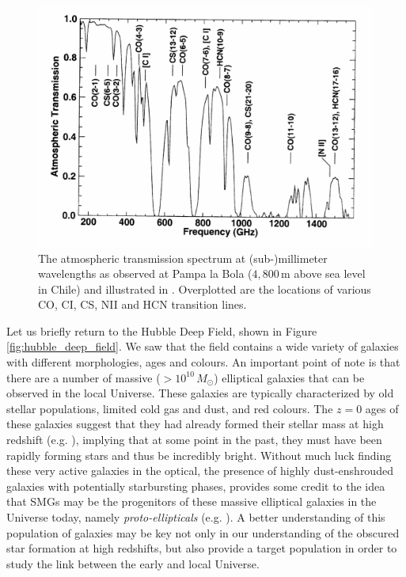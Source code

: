 \begin{figure}
    \centering
	\includegraphics[angle=0.8, origin=c, width=0.8\columnwidth]{Figures/transmission.pdf}
	\caption[Atmospheric transmission of (sub-) mm wavelengths from Pampa la Bola]{The atmospheric transmission spectrum at (sub-)millimeter wavelengths as observed at Pampa la Bola ($4,800\,$m above sea level in Chile) and illustrated in \citealt{Matsushita_2000}. Overplotted are the locations of various CO, CI, CS, NII and HCN transition lines.}
	\label{fig:transmission}
\end{figure}

Let us briefly return to the Hubble Deep Field, shown in Figure \ref{fig:hubble_deep_field}. We saw that the field contains a wide variety of galaxies with different morphologies, ages and colours. An important point of note is that there are a number of massive ($>10^{10}\,M_\odot$) elliptical galaxies that can be observed in the local Universe. These galaxies are typically characterized by old stellar populations, limited cold gas and dust, and red colours. The $z = 0$ ages of these galaxies suggest that they had already formed their stellar mass at high redshift (e.g. \citealt{Gallazzi_2005, Thomas_2005}), implying that at some point in the past, they must have been rapidly forming stars and thus be incredibly bright. Without much luck finding these very active galaxies in the optical, the presence of highly dust-enshrouded galaxies with potentially starbursting phases, provides some credit to the idea that SMGs may be the progenitors of these massive elliptical galaxies in the Universe today, namely \textit{proto-ellipticals} (e.g. \citealt{Toft_2014, Valentino_2020b}). A better understanding of this population of galaxies may be key not only in our understanding of the obscured star formation at high redshifts, but also provide a target population in order to study the link between the early and local Universe.


